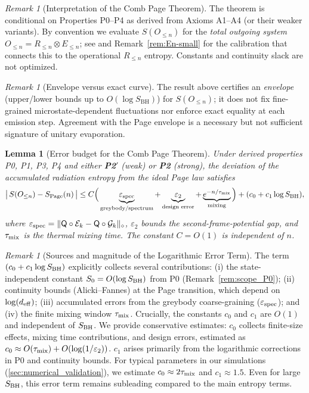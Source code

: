 \documentclass[11pt,a4paper]{article}
\newcommand{\Ptwo}{\textbf{P2}\xspace}
\newcommand{\PtwoPrime}{\textbf{P2$'$}\xspace}
\newcommand{\SBH}{\ensuremath{S_{\mathrm{BH}}}}
\theoremstyle{plain}
\newtheorem{lemma}[theorem]{Lemma}
\theoremstyle{definition}
\theoremstyle{remark}
\newtheorem{remark}[theorem]{Remark}
\begin{document}
\begin{remark}[Interpretation of the Comb Page Theorem]
The theorem is conditional on Properties P0--P4 as derived from Axioms A1--A4 (or their weaker variants).
By convention we evaluate $S(O_{\le n})$ for the \emph{total outgoing system} $O_{\le n}=R_{\le n}\otimes E_{\le n}$; see  and Remark~\ref{rem:En-small} for the calibration that connects this to the operational $R_{\le n}$ entropy. Constants and continuity slack are not optimized.
\end{remark}

\begin{remark}[Envelope versus exact curve]
The result above certifies an \emph{envelope} (upper/lower bounds up to $O(\log \SBH)$) for $S(O_{\le n})$; it does not fix fine-grained microstate-dependent fluctuations nor enforce exact equality at each emission step. Agreement with the Page envelope is a necessary but not sufficient signature of unitary evaporation.
\end{remark}

\begin{lemma}[Error budget for the Comb Page Theorem]
\label{lem:comb-error-budget}
Under derived properties P0, P1, P3, P4 and either \PtwoPrime{} (weak) or \Ptwo{} (strong),
the deviation of the accumulated radiation entropy from the ideal Page law satisfies
\[
\big|\,S(O_{\le n}) - S_{\rm Page}(n)\,\big|
\le C\Big( \underbrace{\varepsilon_{\rm spec}}_{\text{greybody/spectrum}} 
+ \underbrace{\varepsilon_2}_{\text{design error}}
+ \underbrace{e^{-n/\tau_{\rm mix}}}_{\text{mixing}} \Big)
+ (c_0 + c_1\log S_{\rm BH}),
\]
where $\varepsilon_{\rm spec}=\|\mathsf{Q}\circ \mathcal{E}_k - \mathsf{Q}\circ \mathcal{G}_k\|_\diamond$,
$\varepsilon_2$ bounds the second-frame-potential gap, and $\tau_{\rm mix}$ is the thermal mixing time.
The constant $C=O(1)$ is independent of $n$.
\end{lemma}
\begin{remark}[Sources and magnitude of the Logarithmic Error Term]
\label{rem:log_error_sources}
The term $(c_0 + c_1\log S_{\rm BH})$ explicitly collects several contributions: (i) the state-independent constant $S_0=O(\log S_{\rm BH})$ from P0 (Remark~\ref{rem:scope_P0}); (ii) continuity bounds (Alicki--Fannes) at the Page transition, which depend on $\log(d_{\rm eff})$; (iii) accumulated errors from the greybody coarse-graining ($\varepsilon_{\rm spec}$); and (iv) the finite mixing window $\tau_{\rm mix}$.
Crucially, the constants $c_0$ and $c_1$ are $O(1)$ and independent of $S_{\rm BH}$. We provide conservative estimates: $c_0$ collects finite-size effects, mixing time contributions, and design errors, estimated as $c_0 \approx O(\tau_{\rm mix}) + O(\log(1/\varepsilon_2))$. $c_1$ arises primarily from the logarithmic corrections in P0 and continuity bounds. For typical parameters in our simulations (\cref{sec:numerical_validation}), we estimate $c_0 \approx 2\tau_{\rm mix}$ and $c_1 \approx 1.5$. Even for large $S_{\rm BH}$, this error term remains subleading compared to the main entropy terms.
\end{remark}
\end{document}
